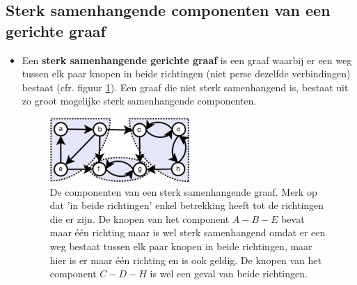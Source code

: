 \subsection{Sterk samenhangende componenten van een gerichte graaf}
\begin{itemize}
	\item Een \textbf{sterk samenhangende gerichte graaf} is een graaf waarbij er een weg tussen elk paar knopen in beide richtingen (niet perse dezelfde verbindingen) bestaat (cfr. figuur \ref{fig:sterk_samenhangende_graaf}). Een graaf die niet sterk samenhangend is, bestaat uit zo groot mogelijke sterk samenhangende componenten. 
	\begin{figure}[ht]
		\centering
		\includegraphics[width=0.5\textwidth]{img/sterk_samenhangende_graaf}
		\caption{De componenten van een sterk samenhangende graaf. Merk op dat 'in beide richtingen' enkel betrekking heeft tot de richtingen die er zijn. De knopen van het component $A - B - E$ bevat maar één richting maar is wel sterk samenhangend omdat er een weg bestaat tussen elk paar knopen in beide richtingen, maar hier is er maar één richting en is ook geldig. De knopen van het component $C - D - H$ is wel een geval van beide richtingen.}
		\label{fig:sterk_samenhangende_graaf}
	\end{figure}
				

\end{itemize}
